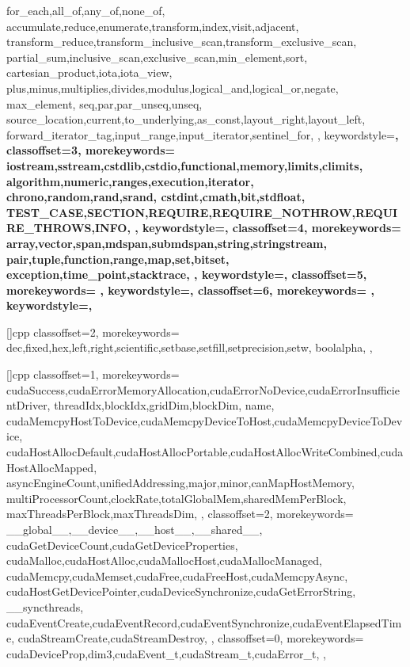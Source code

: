 {{    %
    for_each,all_of,any_of,none_of,
    accumulate,reduce,enumerate,transform,index,visit,adjacent,
    transform_reduce,transform_inclusive_scan,transform_exclusive_scan,
    partial_sum,inclusive_scan,exclusive_scan,min_element,sort,
    cartesian_product,iota,iota_view,
    plus,minus,multiplies,divides,modulus,logical_and,logical_or,negate,
    max_element,
    seq,par,par_unseq,unseq,
    source_location,current,to_underlying,as_const,layout_right,layout_left,
    forward_iterator_tag,input_range,input_iterator,sentinel_for,
  },
  keywordstyle=\bfseries\color{jade},
  classoffset=3,
  morekeywords={
    iostream,sstream,cstdlib,cstdio,functional,memory,limits,climits,
    algorithm,numeric,ranges,execution,iterator,
    chrono,random,rand,srand,
    cstdint,cmath,bit,stdfloat,
    TEST_CASE,SECTION,REQUIRE,REQUIRE_NOTHROW,REQUIRE_THROWS,INFO,
  },
  keywordstyle=\bfseries\color{green!40!blue!60},
  classoffset=4,
  morekeywords={
    array,vector,span,mdspan,submdspan,string,stringstream,
    pair,tuple,function,range,map,set,bitset,
    exception,time_point,stacktrace,
  },
  keywordstyle=\bfseries\color{amethyst},
  classoffset=5,
  morekeywords={
  },
  keywordstyle=\bfseries\color{green!40!red!60},
  classoffset=6,
  morekeywords={
  },
  keywordstyle=\bfseries\color{green!70!red!30},
}
\newcommand\lstcstd[1]{\lstinline{std::#1}}

[]{cpp}{
  classoffset=2,
  morekeywords={
    dec,fixed,hex,left,right,scientific,setbase,setfill,setprecision,setw,
    boolalpha,
  },
}

[]{cpp}{
  classoffset=1,
  morekeywords={
    cudaSuccess,cudaErrorMemoryAllocation,cudaErrorNoDevice,cudaErrorInsufficientDriver,
    threadIdx,blockIdx,gridDim,blockDim,
    name,
    cudaMemcpyHostToDevice,cudaMemcpyDeviceToHost,cudaMemcpyDeviceToDevice,
    cudaHostAllocDefault,cudaHostAllocPortable,cudaHostAllocWriteCombined,cudaHostAllocMapped,
    asyncEngineCount,unifiedAddressing,major,minor,canMapHostMemory,
    multiProcessorCount,clockRate,totalGlobalMem,sharedMemPerBlock,
    maxThreadsPerBlock,maxThreadsDim,
  },
  classoffset=2,
  morekeywords={
    __global__,__device__,__host__,__shared__,
    cudaGetDeviceCount,cudaGetDeviceProperties,
    cudaMalloc,cudaHostAlloc,cudaMallocHost,cudaMallocManaged,
    cudaMemcpy,cudaMemset,cudaFree,cudaFreeHost,cudaMemcpyAsync,
    cudaHostGetDevicePointer,cudaDeviceSynchronize,cudaGetErrorString,
    __syncthreads,
    cudaEventCreate,cudaEventRecord,cudaEventSynchronize,cudaEventElapsedTime,
    cudaStreamCreate,cudaStreamDestroy,
  },
  classoffset=0,
  morekeywords={
    cudaDeviceProp,dim3,cudaEvent_t,cudaStream_t,cudaError_t,
  },
}

